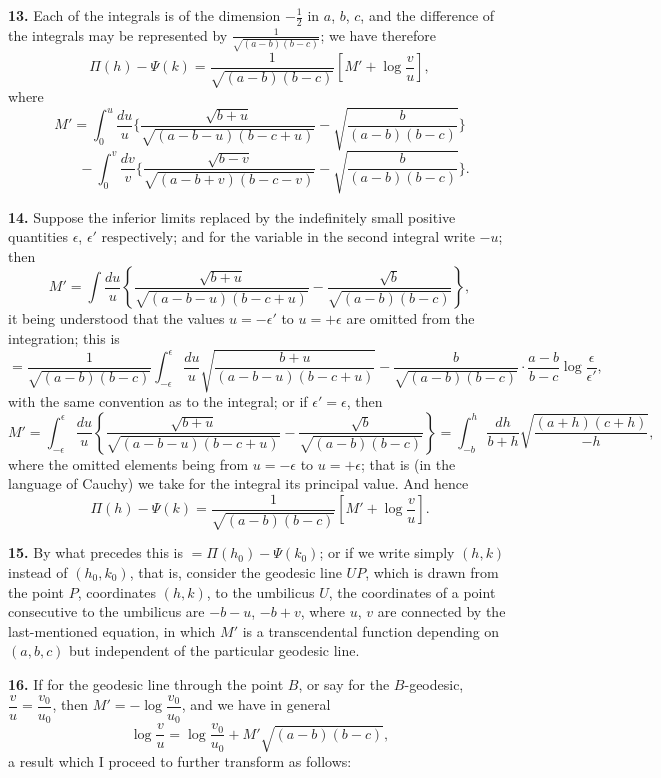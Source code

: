 \documentclass[11pt,a4paper]{article}
\begin{document}
\noindent\textbf{13.} Each of the integrals is of the dimension $-\tfrac{1}{2}$ in $a$, $b$, $c$, and the difference of the integrals may be represented by $\tfrac{1}{\sqrt{(a-b)(b-c)}}$; we have therefore
\[
\Pi(h) - \Psi(k) = \frac{1}{\sqrt{(a-b)(b-c)}} \left[ M' + \log \frac{v}{u} \right],
\]
where
\[
M' = \int_{0}^{u} \frac{du}{u} \Bigg\{ \frac{\sqrt{b+u}}{\sqrt{(a-b-u)(b-c+u)}} - \sqrt{\frac{b}{(a-b)(b-c)}} \Bigg\}
\]
\[
\qquad - \int_{0}^{v} \frac{dv}{v} \Bigg\{ \frac{\sqrt{b-v}}{\sqrt{(a-b+v)(b-c-v)}} - \sqrt{\frac{b}{(a-b)(b-c)}} \Bigg\}.
\]

\noindent\textbf{14.} Suppose the inferior limits replaced by the indefinitely small positive quantities $\epsilon$, $\epsilon'$ respectively; and for the variable in the second integral write $-u$; then
\[
M' = \int \frac{du}{u} \left\{ \frac{\sqrt{b+u}}{\sqrt{(a-b-u)(b-c+u)}} - \frac{\sqrt{b}}{\sqrt{(a-b)(b-c)}} \right\},
\]
it being understood that the values $u = -\epsilon'$ to $u = +\epsilon$ are omitted from the integration; this is
\[
= \frac{1}{\sqrt{(a-b)(b-c)}} \int_{-\epsilon}^{\epsilon} \frac{du}{u} \sqrt{\frac{b+u}{(a-b-u)(b-c+u)}} - \frac{b}{\sqrt{(a-b)(b-c)}} \cdot \frac{a-b}{b-c} \log \frac{\epsilon}{\epsilon'},
\]
with the same convention as to the integral; or if $\epsilon' = \epsilon$, then
\[
M' = \int_{-\epsilon}^{\epsilon} \frac{du}{u} \left\{ \frac{\sqrt{b+u}}{\sqrt{(a-b-u)(b-c+u)}} - \frac{\sqrt{b}}{\sqrt{(a-b)(b-c)}} \right\} = \int_{-b}^{h} \frac{dh}{b+h} \sqrt{\frac{(a+h)(c+h)}{-h}},
\]
where the omitted elements being from $u = -\epsilon$ to $u = +\epsilon$; that is (in the language of Cauchy) we take for the integral its principal value. And hence
\[
\Pi(h) - \Psi(k) = \frac{1}{\sqrt{(a-b)(b-c)}} \left[ M' + \log \frac{v}{u} \right].
\]

\noindent\textbf{15.} By what precedes this is $= \Pi(h_{0}) - \Psi(k_{0})$; or if we write simply $(h, k)$ instead of $(h_{0}, k_{0})$, that is, consider the geodesic line $UP$, which is drawn from the point $P$, coordinates $(h, k)$, to the umbilicus $U$, the coordinates of a point consecutive to the umbilicus are $-b-u$, $-b+v$, where $u$, $v$ are connected by the last-mentioned equation, in which $M'$ is a transcendental function depending on $(a, b, c)$ but independent of the particular geodesic line.

\noindent\textbf{16.} If for the geodesic line through the point $B$, or say for the $B$-geodesic, $\dfrac{v}{u} = \dfrac{v_{0}}{u_{0}}$, then $M' = -\log \dfrac{v_{0}}{u_{0}}$, and we have in general
\[
\log \frac{v}{u} = \log \frac{v_{0}}{u_{0}} + M' \sqrt{(a-b)(b-c)},
\]
a result which I proceed to further transform as follows:
\end{document}
